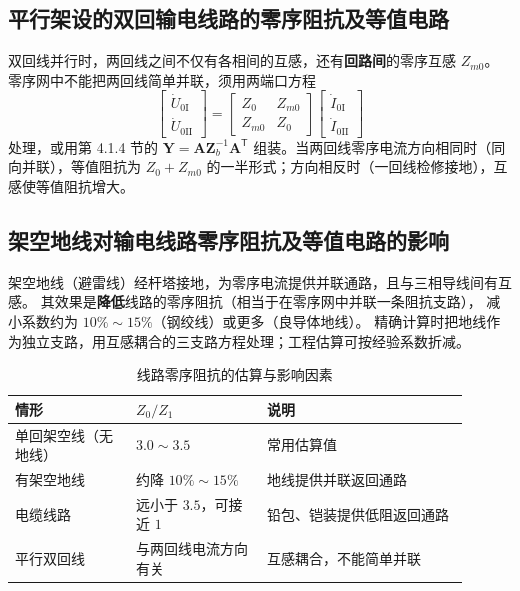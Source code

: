 \subsection{平行架设的双回输电线路的零序阻抗及等值电路}

双回线并行时，两回线之间不仅有各相间的互感，还有\textbf{回路间}的零序互感 $Z_{m0}$。
零序网中不能把两回线简单并联，须用两端口方程
\begin{equation}
  \begin{bmatrix}\dot U_{0\text{I}}\\ \dot U_{0\text{II}}\end{bmatrix}
  =\begin{bmatrix}Z_0 & Z_{m0}\\ Z_{m0} & Z_0\end{bmatrix}
  \begin{bmatrix}\dot I_{0\text{I}}\\ \dot I_{0\text{II}}\end{bmatrix}
\end{equation}
处理，或用第 4.1.4 节的 $\boldsymbol Y=\boldsymbol A\boldsymbol Z_b^{-1}\boldsymbol A^{\mathsf T}$
组装。当两回线零序电流方向相同时（同向并联），等值阻抗为
$Z_0+Z_{m0}$ 的一半形式；方向相反时（一回线检修接地），互感使等值阻抗增大。

\subsection{架空地线对输电线路零序阻抗及等值电路的影响}

架空地线（避雷线）经杆塔接地，为零序电流提供并联通路，且与三相导线间有互感。
其效果是\textbf{降低}线路的零序阻抗（相当于在零序网中并联一条阻抗支路），
减小系数约为 $10\%\sim15\%$（钢绞线）或更多（良导体地线）。
精确计算时把地线作为独立支路，用互感耦合的三支路方程处理；工程估算可按经验系数折减。

\begin{table}[htbp]
  \centering
  \caption{线路零序阻抗的估算与影响因素}
  \small
  \begin{tabular}{@{}p{0.24\linewidth}p{0.26\linewidth}p{0.40\linewidth}@{}}
    \toprule
    情形 & $Z_0/Z_1$ & 说明 \\
    \midrule
    单回架空线（无地线） & $3.0\sim3.5$ & 常用估算值 \\
    有架空地线 & 约降 $10\%\sim15\%$ & 地线提供并联返回通路 \\
    电缆线路 & 远小于 $3.5$，可接近 $1$ & 铅包、铠装提供低阻返回通路 \\
    平行双回线 & 与两回线电流方向有关 & 互感耦合，不能简单并联 \\
    \bottomrule
  \end{tabular}
\end{table}

